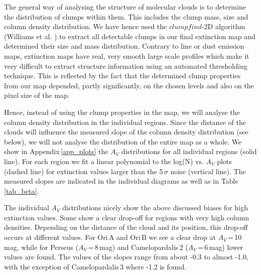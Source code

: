 \documentclass[useAMS,usenatbib]{mn2e}
\begin{document}
The general way of analysing the structure of molecular clouds is to determine
the distribution of clumps within them. This includes the clump mass, size and
column density distribution. We have hence used the $clumpfind$-2D algorithm
(Williams et al. \cite{1994ApJ...428..693W}) to extract all detectable clumps in
our final extinction map and determined their size and mass distribution.
Contrary to line or dust emission maps, extinction maps have real, very smooth
large scale profiles which make it very difficult to extract structure
information using an automated thresholding technique. This is reflected by the
fact that the determined clump properties from our map depended, partly
significantly, on the chosen levels and also on the pixel size of the map.

Hence, instead of using the clump properties in the map, we will analyse the
column density distribution in the individual regions. Since the distance of the
clouds will influence the measured slope of the column density distribution (see
below), we will not analyse the distribution of the entire map as a whole. We
show in Appendix\,\ref{app_plots} the $A_V$ distributions for all individual
regions (solid line). For each region we fit a linear polynomial to the log(N)
vs. $A_V$ plots (dashed line) for extinction values larger than the 5\,$\sigma$
noise (vertical line). The measured slopes are indicated in the individual
diagrams as well as in Table\,\ref{tab_beta}.

The individual $A_V$ distributions nicely show the above discussed biases for
high extinction values. Some show a clear drop-off for regions with very high
column densities. Depending on the distance of the cloud and its position, this
drop-off occurs at different values. For Ori\,A and Ori\,B we see a clear drop
at $A_V$\,=\,10\,mag, while for Perseus ($A_V$\,=\,8\,mag) and Camelopardalis\,2
($A_V$\,=\,6\,mag) lower values are found. The values of the slopes range from
about -0.3 to almost -1.0, with the exception of Camelopardalis\,3 where -1.2 is
found. 
\end{document}

